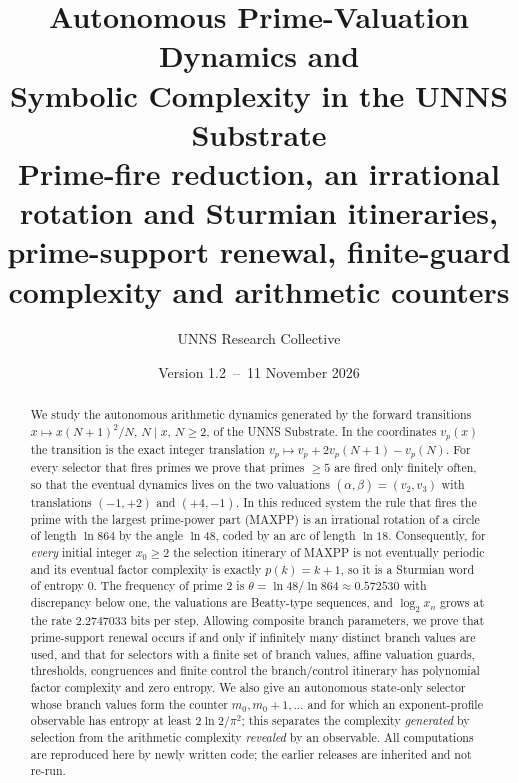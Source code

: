 \title{\textbf{Autonomous Prime-Valuation Dynamics and\\ Symbolic Complexity in the UNNS Substrate}\\[6pt]
\large Prime-fire reduction, an irrational rotation and Sturmian itineraries, prime-support renewal, finite-guard complexity and arithmetic counters}
\author{UNNS Research Collective}
\date{Version 1.2 \,--\, 11 November 2026}


\maketitle

\begin{abstract}
\noindent
We study the autonomous arithmetic dynamics generated by the forward transitions $x\mapsto x(N+1)^2/N$, $N\mid x$, $N\ge2$, of the UNNS Substrate.
In the coordinates $v_p(x)$ the transition is the exact integer translation $v_p\mapsto v_p+2v_p(N+1)-v_p(N)$.
For every selector that fires primes we prove that primes $\ge5$ are fired only finitely often, so that the eventual dynamics lives on the two valuations $(\alpha,\beta)=(v_2,v_3)$ with translations $(-1,+2)$ and $(+4,-1)$.
In this reduced system the rule that fires the prime with the largest prime-power part (\textsf{MAXPP}) is an irrational rotation of a circle of length $\ln 864$ by the angle $\ln 48$, coded by an arc of length $\ln 18$.
Consequently, for \emph{every} initial integer $x_0\ge2$ the selection itinerary of \textsf{MAXPP} is not eventually periodic and its eventual factor complexity is exactly $p(k)=k+1$, so it is a Sturmian word of entropy $0$.
The frequency of prime $2$ is $\theta=\ln48/\ln864\approx0.572530$ with discrepancy below one, the valuations are Beatty-type sequences, and $\log_2x_n$ grows at the rate $2.2747033$ bits per step.
Allowing composite branch parameters, we prove that prime-support renewal occurs if and only if infinitely many distinct branch values are used, and that for selectors with a finite set of branch values, affine valuation guards, thresholds, congruences and finite control the branch/control itinerary has polynomial factor complexity and zero entropy.
We also give an autonomous state-only selector whose branch values form the counter $m_0,m_0+1,\dots$ and for which an exponent-profile observable has entropy at least $2\ln2/\pi^2$; this separates the complexity \emph{generated} by selection from the arithmetic complexity \emph{revealed} by an observable.
All computations are reproduced here by newly written code; the earlier releases are inherited and not re-run.
\end{abstract}


